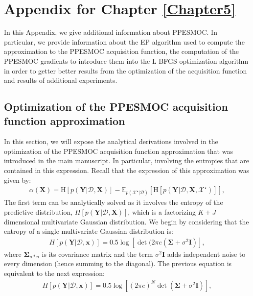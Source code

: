 
\chapter{Appendix for Chapter \ref{Chapter5}}
\label{AppendixC}

In this Appendix, we give additional information about PPESMOC. In particular, we provide information about the EP algorithm used to compute the approximation to the PPESMOC acquisition function, the computation of the PPESMOC gradients to introduce them into the L-BFGS optimization algorithm in order to getter better results from the optimization of the acquisition function and results of additional experiments.

\section{Optimization of the PPESMOC acquisition function approximation}
In this section, we will expose the analytical derivations involved in the optimization of the PPESMOC acquisition function approximation that was introduced in the main manuscript. In particular, involving the entropies that are contained in this expression. Recall that the expression of this approximation was given by:
\begin{align}
\alpha(\mathbf{X}) = \text{H}[p(\mathbf{Y}|\mathcal{D},\mathbf{X})] - 
        \mathbb{E}_{p(\mathcal{X}^\star|\mathcal{D})}[\text{H}[p(\mathbf{Y}|\mathcal{D},\mathbf{X},\mathcal{X}^\star)]],
\label{eq:acq_simplified}
\end{align}
The first term can be analytically solved as it involves the entropy of the predictive distribution, $H[p(\mathbf{Y}|\mathcal{D},\mathbf{X})]$, which is a factorizing $K+J$ dimensional multivariate Gaussian distribution. We begin by considering that the entropy of a single multivariate Gaussian distribution is:
\begin{align}
H[p(\mathbf{Y}|\mathcal{D},\mathbf{x})] = 0.5\log[\det(2\pi e(\mathbf{\Sigma}+\sigma^2\mathbf{I})],
\end{align}
where $\mathbf{\Sigma}_{n*n}$ is its covariance matrix and the term $\sigma^2\mathbf{I}$ adds independent noise to every dimension (hence summing to the diagonal). The previous equation is equivalent to the next expression:
\begin{align}
H[p(\mathbf{Y}|\mathcal{D},\mathbf{x})] = 0.5\log[(2\pi e)^{N}\det(\mathbf{\Sigma}+\sigma^2\mathbf{I})],
\end{align}

